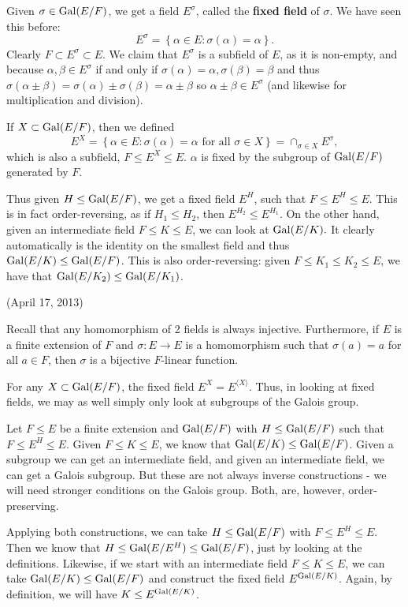 \documentclass{../mathnotes}
\begin{document}
Given $\sigma\in\operatorname{Gal}(E/F)$, we get a field $E^\sigma$, called the \textbf{fixed field} of $\sigma$. We have seen this before:
\[E^\sigma=\left\{ \alpha\in E:\sigma(\alpha)=\alpha \right\}.\]
Clearly $F\subset E^\sigma\subset E$. We claim that $E^\sigma$ is a subfield of $E$, as it is non-empty, and because
$\alpha,\beta\in E^\sigma$ if and only if $\sigma(\alpha)=\alpha,\sigma(\beta)=\beta$ and thus
$\sigma(\alpha\pm\beta)=\sigma(\alpha)\pm\sigma(\beta)=\alpha\pm\beta$ so $\alpha\pm\beta\in E^\sigma$ (and likewise
for multiplication and division).

If $X\subset \operatorname{Gal}(E/F)$, then we defined
\[E^X=\left\{ \alpha\in E:\sigma(\alpha)=\alpha \text{ for all }\sigma\in X \right\}=\cap_{\sigma\in X}E^\sigma,\]
which is also a subfield, $F\leq E^X\leq E$. $\alpha$ is fixed by the subgroup of $\operatorname{Gal}(E/F)$ generated by $F$.

Thus given $H\leq\operatorname{Gal}(E/F)$, we get a fixed field $E^H$, such that $F\leq E^H\leq E$. This is in fact order-reversing,
as if $H_1\leq H_2$, then $E^{H_2}\leq E^{H_1}$. On the other hand, given an intermediate field $F\leq K\leq E$, we can
look at $\operatorname{Gal}(E/K).$ It clearly automatically is the identity on the smallest field and thus $\operatorname{Gal}(E/K)\leq\operatorname{Gal}(E/F)$.
This is also order-reversing: given $F\leq K_1\leq K_2\leq E$, we have that $\operatorname{Gal}(E/K_2)\leq\operatorname{Gal}(E/K_1)$.

(April 17, 2013)

\begin{rem}
    Recall that any homomorphism of 2 fields is always injective. Furthermore, if $E$ is a finite extension of $F$
    and $\sigma: E\to E$ is a homomorphism such that $\sigma(a)=a$ for all $a\in F$, then $\sigma$ is a bijective $F$-linear
    function.
\end{rem}

For any $X\subset\operatorname{Gal}(E/F)$, the fixed field $E^X=E^{\langle X\rangle}$. Thus, in looking at fixed fields, we may as well
simply only look at subgroups of the Galois group.

Let $F\leq E$ be a finite extension and $\operatorname{Gal}(E/F)$ with $H\leq\operatorname{Gal}(E/F)$ such that $F\leq E^H\leq E$. Given $F\leq K\leq E$,
we know that $\operatorname{Gal}(E/K)\leq\operatorname{Gal}(E/F)$. Given a subgroup we can get an intermediate field, and given an intermediate field,
we can get a Galois subgroup. But these are not always inverse constructions - we will need stronger conditions on the Galois
group. Both, are, however, order-preserving.

Applying both constructions, we can take $H\leq\operatorname{Gal}(E/F)$ with $F\leq E^H\leq E$. Then we know that
$H\leq\operatorname{Gal}(E/E^H)\leq\operatorname{Gal}(E/F)$, just by looking at the definitions. Likewise, if we start with an intermediate field
$F\leq K\leq E$, we can take $\operatorname{Gal}(E/K)\leq\operatorname{Gal}(E/F)$ and construct the fixed field $E^{\operatorname{Gal}(E/K)}$. Again, by
definition, we will have $K\leq E^{\operatorname{Gal}(E/K)}$.
\end{document}
